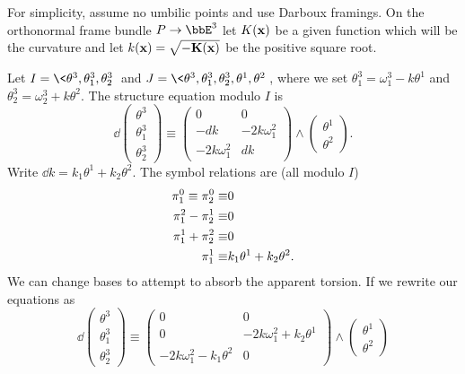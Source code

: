 \begin{example}
    For simplicity, assume no umbilic points and use Darboux framings. On the orthonormal frame bundle $P\to \bbE^3$ let $K(\bf{x})$ be a given function which will be the curvature and let $k(\bf{x})=\sqrt{-K(\bf{x})}$ be the positive square root.

    Let $I=\<\theta^3,\theta^3_1,\theta^3_2\>$ and $J=\<\theta^3,\theta^3_1,\theta^3_2,\theta^1,\theta^2\>$, where we set $\theta^3_1=\omega^3_1-k\theta^1$ and $\theta^3_2=\omega^3_2+k\theta^2$. The structure equation modulo $I$ is 
    \[\dd\begin{pmatrix}
        \theta^3\\\theta^3_1\\\theta^3_2
    \end{pmatrix}\equiv 
    \begin{pmatrix}
        0 & 0\\
        -dk & -2k\omega^2_1\\
        -2k\omega^2_1 & dk
    \end{pmatrix}
    \wedge \begin{pmatrix}
        \theta^1\\\theta^2
    \end{pmatrix}.
    \]
    Write $\dd k=k_1\theta^1+k_2\theta^2$. The symbol relations are  (all modulo $I$)
    \begin{align}
        \pi^0_1\equiv \pi^0_2\equiv& 0 \notag\\
        \pi^2_1-\pi^1_2\equiv& 0\notag\\
        \pi^1_1+\pi^2_2\equiv& 0\notag\\
        \pi^1_1\equiv& k_1\theta^1+k_2\theta^2.
    \end{align}
    We can change bases to attempt to absorb the apparent torsion. If we rewrite our equations as 
    \[\dd\begin{pmatrix}
        \theta^3\\\theta^3_1\\\theta^3_2
    \end{pmatrix}\equiv 
    \begin{pmatrix}
        0 & 0\\
        0 & -2k\omega^2_1+k_2\theta^1\\
        -2k\omega^2_1-k_1\theta^2 & 0
    \end{pmatrix}
    \wedge \begin{pmatrix}
        \theta^1\\\theta^2

\end{pmatrix}\]
\end{example}
